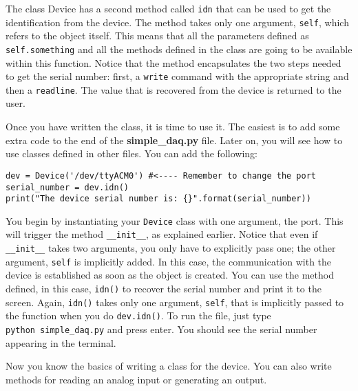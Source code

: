 The class Device has a second method called \texttt{idn} that can be
used to get the identification from the device. The method takes only
one argument, \texttt{self}, which refers to the object itself. This
means that all the parameters defined as \texttt{self.something} and all
the methods defined in the class are going to be available within this
function. Notice that the method encapsulates the two steps needed to
get the serial number: first, a \texttt{write} command with the
appropriate string and then a \texttt{readline}. The value that is
recovered from the device is returned to the user.

Once you have written the class, it is time to use it. The easiest is to
add some extra code to the end of the \textbf{simple\_daq.py} file.
Later on, you will see how to use classes defined in other files. You
can add the following:

\begin{verbatim}
dev = Device('/dev/ttyACM0') #<---- Remember to change the port
serial_number = dev.idn()
print("The device serial number is: {}".format(serial_number))
\end{verbatim}

You begin by instantiating your \texttt{Device} class with one argument,
the port. This will trigger the method \texttt{\_\_init\_\_}, as
explained earlier. Notice that even if \texttt{\_\_init\_\_} takes two
arguments, you only have to explicitly pass one; the other argument,
\texttt{self} is implicitly added. In this case, the communication with
the device is established as soon as the object is created. You can use
the method defined, in this case, \texttt{idn()} to recover the serial
number and print it to the screen. Again, \texttt{idn()} takes only one
argument, \texttt{self}, that is implicitly passed to the function when
you do \texttt{dev.idn()}. To run the file, just type
\texttt{python\ simple\_daq.py} and press enter. You should see the
serial number appearing in the terminal.

Now you know the basics of writing a class for the device. You can also
write methods for reading an analog input or generating an output.



